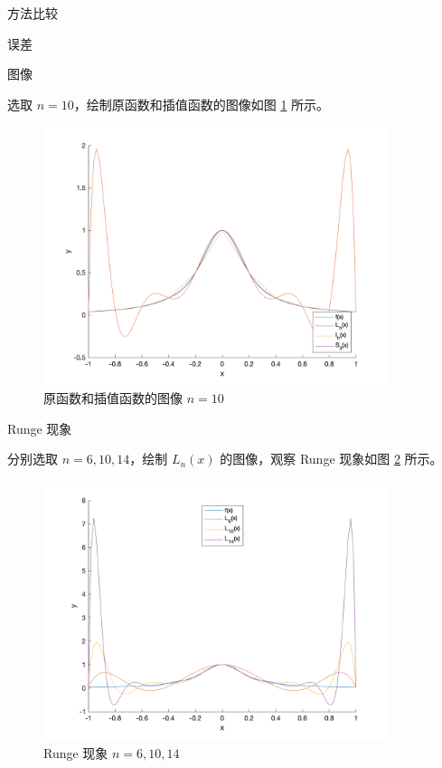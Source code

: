 \documentclass[a4paper]{article}
\begin{document}
\begin{multicols}{2}
\begin{section}{方法比较}
\begin{subsection}{误差}
	\end{subsection}
	
	\begin{subsection}{图像}
	
		选取 $n=10$，绘制原函数和插值函数的图像如图 \ref{compare} 所示。
		
		\begin{figure}[ht]
			\centering
			\includegraphics[width = 0.9\textwidth]{img/compare.png} 
			\caption{原函数和插值函数的图像 $n=10$}
			\label{compare} 
		\end{figure}	
		
		\begin{subsubsection}{Runge 现象}
		
			分别选取 $n=6, 10, 14$，绘制 $L_n(x)$ 的图像，观察 Runge 现象如图 \ref{runge} 所示。
			
			\begin{figure}[ht]
				\centering
				\includegraphics[width = 0.9\textwidth]{img/runge.png} 
				\caption{Runge 现象 $n=6,10,14$}
				\label{runge} 
			\end{figure}	 
			

\end{subsubsection}
\end{subsection}
\end{section}
\end{multicols}
\end{document}
